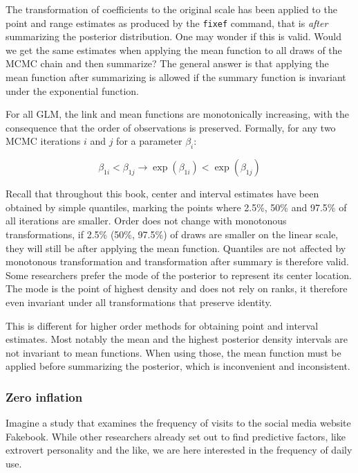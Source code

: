 \documentclass[]{svmono}
\theoremstyle{definition}
\theoremstyle{definition}
\theoremstyle{definition}
\theoremstyle{remark}
\begin{document}
The transformation of coefficients to the original scale has been
applied to the point and range estimates as produced by the
\texttt{fixef} command, that is \emph{after} summarizing the posterior
distribution. One may wonder if this is valid. Would we get the same
estimates when applying the mean function to all draws of the MCMC chain
and then summarize? The general answer is that applying the mean
function after summarizing is allowed if the summary function is
invariant under the exponential function.

For all GLM, the link and mean functions are monotonically increasing,
with the consequence that the order of observations is preserved.
Formally, for any two MCMC iterations \(i\) and \(j\) for a parameter
\(\beta_i\):

\[
\beta_{1i} < \beta_{1j} \rightarrow \exp(\beta_{1i}) < \exp(\beta_{1j})
\]

Recall that throughout this book, center and interval estimates have
been obtained by simple quantiles, marking the points where 2.5\%, 50\%
and 97.5\% of all iterations are smaller. Order does not change with
monotonous transformations, if 2.5\% (50\%, 97.5\%) of draws are smaller
on the linear scale, they will still be after applying the mean
function. Quantiles are not affected by monotonous transformation and
transformation after summary is therefore valid. Some researchers prefer
the mode of the posterior to represent its center location. The mode is
the point of highest density and does not rely on ranks, it therefore
even invariant under all transformations that preserve identity.

This is different for higher order methods for obtaining point and
interval estimates. Most notably the mean and the highest posterior
density intervals are not invariant to mean functions. When using those,
the mean function must be applied before summarizing the posterior,
which is inconvenient and inconsistent.

\subsubsection{Zero inflation}\label{zero-inflation}

Imagine a study that examines the frequency of visits to the social
media website Fakebook. While other researchers already set out to find
predictive factors, like extrovert personality and the like, we are here
interested in the frequency of daily use.
\end{document}
